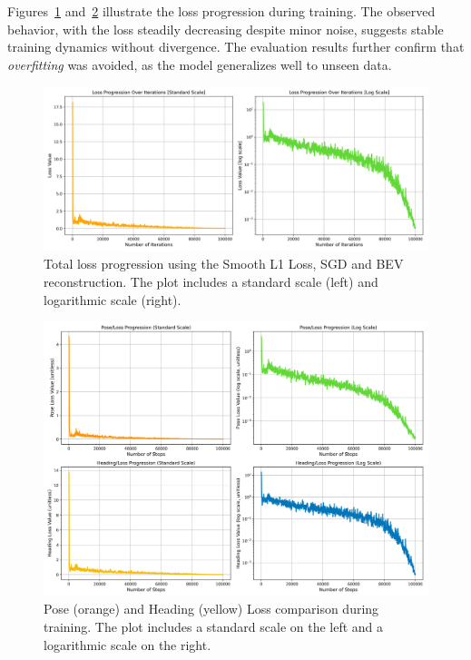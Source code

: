 Figures~\ref{fig:loss_comparison_2} and~\ref{fig:total_loss_2} illustrate the loss progression during training. The observed behavior, with the loss steadily decreasing despite minor noise, suggests stable training dynamics without divergence. The evaluation results further confirm that \textit{overfitting} was avoided, as the model generalizes well to unseen data.
\begin{figure}[H]
    \centering
    \includegraphics[width=1\linewidth]{LateX//figs/BEV2_loss_total_l1sDEG_progression_comparison.png}
    \caption{Total loss progression using the Smooth L1 Loss, SGD and BEV reconstruction. The plot includes a standard scale (left) and logarithmic scale (right).}
    \label{fig:loss_comparison_2}
\end{figure}
\begin{figure}[H]
    \centering
    \includegraphics[width=1\linewidth]{LateX//figs/BEV2_l1sDEG_pose_heading_loss_comparison.png}
    \caption{Pose (orange) and Heading (yellow) Loss comparison during training. The plot includes a standard scale on the left and a logarithmic scale on the right.}
    \label{fig:total_loss_2}
\end{figure}

